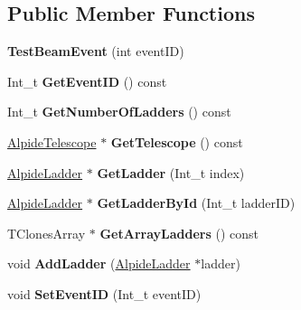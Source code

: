 \subsection*{Public Member Functions}
\begin{DoxyCompactItemize}
\item 
\mbox{\label{class_test_beam_event_a6eb03eb6d756ef2333730a7c45c384ff}} 
{\bfseries Test\+Beam\+Event} (int event\+ID)
\item 
\mbox{\label{class_test_beam_event_a24181fa9039970765268659c88c1f514}} 
Int\+\_\+t {\bfseries Get\+Event\+ID} () const
\item 
\mbox{\label{class_test_beam_event_a2bf15ab9482d7fd02436487baba2efe5}} 
Int\+\_\+t {\bfseries Get\+Number\+Of\+Ladders} () const
\item 
\mbox{\label{class_test_beam_event_af0ec87e7f48f72e0e862dffc53815db5}} 
\mbox{\hyperlink{class_alpide_telescope}{Alpide\+Telescope}} $\ast$ {\bfseries Get\+Telescope} () const
\item 
\mbox{\label{class_test_beam_event_ab39a199bb41a78b8a5d8d0ae564c9294}} 
\mbox{\hyperlink{class_alpide_ladder}{Alpide\+Ladder}} $\ast$ {\bfseries Get\+Ladder} (Int\+\_\+t index)
\item 
\mbox{\label{class_test_beam_event_a0c24b61aa21b532fb9b75e9a6174b8ab}} 
\mbox{\hyperlink{class_alpide_ladder}{Alpide\+Ladder}} $\ast$ {\bfseries Get\+Ladder\+By\+Id} (Int\+\_\+t ladder\+ID)
\item 
\mbox{\label{class_test_beam_event_a42227b3585f6168c4fe20fc3743d2853}} 
T\+Clones\+Array $\ast$ {\bfseries Get\+Array\+Ladders} () const
\item 
\mbox{\label{class_test_beam_event_afd3a06a34d7c2ad20c18540055704f89}} 
void {\bfseries Add\+Ladder} (\mbox{\hyperlink{class_alpide_ladder}{Alpide\+Ladder}} $\ast$ladder)
\item 
\mbox{\label{class_test_beam_event_a12430bdd449a4acb6c01a94729d5c774}} 
void {\bfseries Set\+Event\+ID} (Int\+\_\+t event\+ID)

\end{DoxyCompactItemize}
